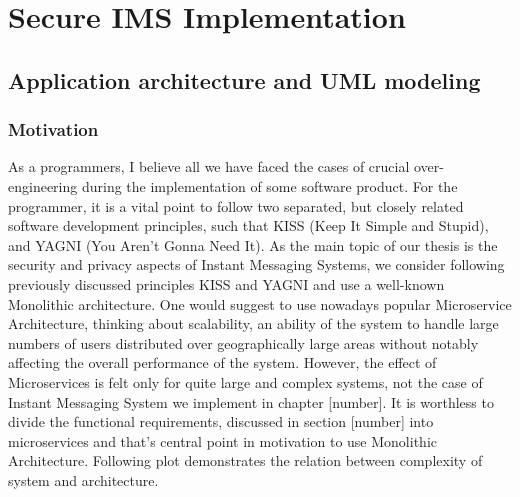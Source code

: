 \chapter{Secure IMS Implementation}\label{ch:secure-ims-implementation}


\section{Application architecture and UML modeling}\label{sec:application-architecture-and-uml-modeling}

\subsection{Motivation}\label{subsec:motivation}
As a programmers, I believe all we have faced the cases of crucial over-engineering during the implementation of some software product.
For the programmer, it is a vital point to follow two separated, but closely related software development principles, such that
KISS (Keep It Simple and Stupid), and YAGNI (You Aren't Gonna Need It).
As the main topic of our thesis is the security and privacy aspects of Instant Messaging Systems, we consider following
previously discussed principles KISS and YAGNI and use a well-known Monolithic architecture.
One would suggest to use nowadays popular Microservice Architecture, thinking about scalability,
an ability of the system to handle large numbers of users distributed over geographically large areas without notably affecting
the overall performance of the system.
However, the effect of Microservices is felt only for quite large and complex systems, not the case of Instant Messaging System
we implement in chapter [number].
It is worthless to divide the functional requirements, discussed in section [number] into microservices and that's central point
in motivation to use Monolithic Architecture.
Following plot demonstrates the relation between complexity of system and architecture.

